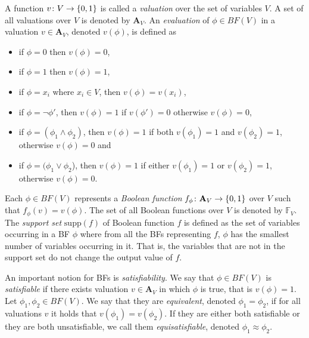 \documentclass[
  digital, %
  twoside, %
  table,   %
  nolof,     %
  nolot,     %
]{fithesis3}
\let\setbuilder\set
\newcommand{\simpleset}[1]{\{{#1}\}}
\renewcommand{\set}[1]{\normalexpandarg\IfSubStr{#1}{|}{\setbuilder{#1}}{\simpleset{#1}}}
\theoremstyle{definition}
\theoremstyle{remark}
\newcommand{\BF}[1]{BF(#1)}
\newcommand{\valtns}[1]{\mathbf{A}_{#1}}
\newcommand{\BFuncs}[1]{\mathbb{F}_{#1}}
\newcommand{\supp}[1]{\text{supp}(#1)}
\begin{document}
A function $v\colon V \to \set{0,1}$ is called a \emph{valuation} over the set of variables $V$. A set of all valuations over $V$ is denoted by $\valtns{V}$. An \emph{evaluation} of $\phi \in \BF{V}$ in a valuation $v \in \valtns{V}$, denoted $v(\phi)$, is defined as %
\begin{itemize}
    \item if $\phi = 0$ then $v(\phi) = 0$,
    \item if $\phi = 1$ then $v(\phi) = 1$,
    \item if $\phi = x_i$ where $x_i \in V$, then $v(\phi) = v(x_i)$,
    \item if $\phi = \neg\phi'$, then $v(\phi) = 1$ if $v(\phi') = 0$ otherwise $v(\phi) = 0$,
    \item if $\phi = (\phi_1 \land \phi_2)$, then $v(\phi) = 1$ if both $v(\phi_1) = 1$ and $v(\phi_2) = 1$, otherwise $v(\phi) = 0$ and
    \item if $\phi = (\phi_1 \lor \phi_2$), then $v(\phi) = 1$ if either $v(\phi_1) = 1$ or $v(\phi_2) = 1$, otherwise $v(\phi) = 0$.
\end{itemize}
Each $\phi \in \BF{V}$ represents a \emph{Boolean function} $f_{\phi}\colon \valtns{V} \to \set{0,1}$ over $V$ such that $f_{\phi}(v) = v(\phi)$. The set of all Boolean functions over $V$ is denoted by $\BFuncs{V}$. The \emph{support set} $\supp{f}$ of Boolean function $f$ is defined as the set of variables occurring in a BF $\phi$ where from all the BFs representing $f$, $\phi$ has the smallest number of variables occurring in it. That is, the variables that are not in the support set do not change the output value of $f$.


An important notion for BFs is \emph{satisfiability}. We say that $\phi \in \BF{V}$ is \emph{satisfiable} if there exists valuation $v \in \valtns{V}$ in which $\phi$ is true, that is $v(\phi) = 1$. Let $\phi_1, \phi_2 \in \BF{V}$. We say that they are \emph{equivalent}, denoted $\phi_1 = \phi_2$, if for all valuations $v$ it holds that $v(\phi_1) = v(\phi_2)$. If they are either both satisfiable or they are both unsatisfiable, we call them \emph{equisatisfiable}, denoted $\phi_1 \approx \phi_2$. %
\end{document}
